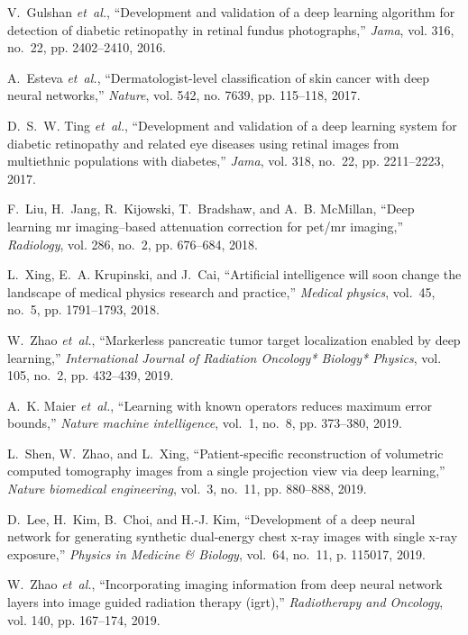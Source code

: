 \documentclass[journal,twoside,web]{ieeecolor}
\begin{document}
\begin{thebibliography}{10}
V.~Gulshan \emph{et~al.}, ``Development and validation of a deep learning
  algorithm for detection of diabetic retinopathy in retinal fundus
  photographs,'' \emph{Jama}, vol. 316, no.~22, pp. 2402--2410, 2016.

A.~Esteva \emph{et~al.}, ``Dermatologist-level classification of skin cancer
  with deep neural networks,'' \emph{Nature}, vol. 542, no. 7639, pp. 115--118,
  2017.

D.~S.~W. Ting \emph{et~al.}, ``Development and validation of a deep learning
  system for diabetic retinopathy and related eye diseases using retinal images
  from multiethnic populations with diabetes,'' \emph{Jama}, vol. 318, no.~22,
  pp. 2211--2223, 2017.

F.~Liu, H.~Jang, R.~Kijowski, T.~Bradshaw, and A.~B. McMillan, ``Deep learning
  mr imaging--based attenuation correction for pet/mr imaging,''
  \emph{Radiology}, vol. 286, no.~2, pp. 676--684, 2018.

L.~Xing, E.~A. Krupinski, and J.~Cai, ``Artificial intelligence will soon
  change the landscape of medical physics research and practice,''
  \emph{Medical physics}, vol.~45, no.~5, pp. 1791--1793, 2018.

W.~Zhao \emph{et~al.}, ``Markerless pancreatic tumor target localization
  enabled by deep learning,'' \emph{International Journal of Radiation
  Oncology* Biology* Physics}, vol. 105, no.~2, pp. 432--439, 2019.

A.~K. Maier \emph{et~al.}, ``Learning with known operators reduces maximum
  error bounds,'' \emph{Nature machine intelligence}, vol.~1, no.~8, pp.
  373--380, 2019.

L.~Shen, W.~Zhao, and L.~Xing, ``Patient-specific reconstruction of volumetric
  computed tomography images from a single projection view via deep learning,''
  \emph{Nature biomedical engineering}, vol.~3, no.~11, pp. 880--888, 2019.

D.~Lee, H.~Kim, B.~Choi, and H.-J. Kim, ``Development of a deep neural network
  for generating synthetic dual-energy chest x-ray images with single x-ray
  exposure,'' \emph{Physics in Medicine \& Biology}, vol.~64, no.~11, p.
  115017, 2019.

W.~Zhao \emph{et~al.}, ``Incorporating imaging information from deep neural
  network layers into image guided radiation therapy (igrt),''
  \emph{Radiotherapy and Oncology}, vol. 140, pp. 167--174, 2019.


\end{thebibliography}
\end{document}
